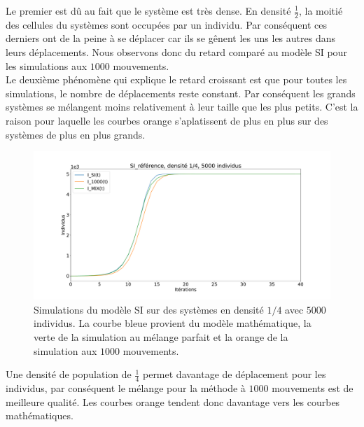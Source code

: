 Le premier est dû au fait que le système est très dense. En densité $\frac{1}{2}$, la moitié des cellules du systèmes sont occupées par un individu. Par conséquent ces derniers ont de la peine à se déplacer car ils se gênent les uns les autres dans leurs déplacements. Nous observons donc du retard comparé au modèle SI pour les simulations aux $1000$ mouvements. \\

Le deuxième phénomène qui explique le retard croissant est que pour toutes les simulations, le nombre de déplacements reste constant. Par conséquent les grands systèmes se mélangent moins relativement à leur taille que les plus petits. C'est la raison pour laquelle les courbes orange s'aplatissent de plus en plus sur des systèmes de plus en plus grands.\\

\newpage

\begin{figure}[h]
	\centering
	\captionsetup{justification=centering}
	\includegraphics[width=1\textwidth]{Images/SI_ref_4_5k.pdf}
	\caption[Simulations de SI, densité 1/4]{Simulations du modèle SI sur des systèmes en densité $1/4$ avec $5000$ individus. La courbe bleue provient du modèle mathématique, la verte de la simulation au mélange parfait et la orange de la simulation aux $1000$ mouvements.}
\end{figure}

Une densité de population de $\frac{1}{4}$ permet davantage de déplacement pour les individus, par conséquent le mélange pour la méthode à $1000$ mouvements est de meilleure qualité. Les courbes orange tendent donc davantage vers les courbes mathématiques.

